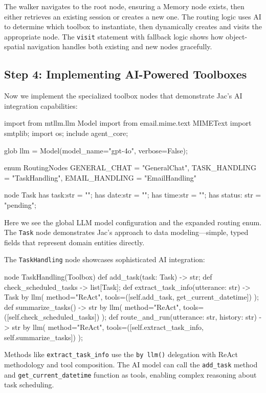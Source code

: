 The walker navigates to the root node, ensuring a Memory node exists, then either retrieves an existing session or creates a new one. The routing logic uses AI to determine which toolbox to instantiate, then dynamically creates and visits the appropriate node. The \texttt{visit} statement with fallback logic shows how object-spatial navigation handles both existing and new nodes gracefully.

\subsection{Step 4: Implementing AI-Powered Toolboxes}

Now we implement the specialized toolbox nodes that demonstrate Jac's AI integration capabilities:

\begin{jacblock}
import from mtllm.llm { Model }
import from email.mime.text { MIMEText }
import smtplib;
import os;
include agent_core;

glob llm = Model(model_name="gpt-4o", verbose=False);

enum RoutingNodes {
    GENERAL_CHAT = "GeneralChat",
    TASK_HANDLING = "TaskHandling",
    EMAIL_HANDLING = "EmailHandling"
}

node Task {
    has task:str = "";
    has date:str = "";
    has time:str = "";
    has status: str = "pending";
}
\end{jacblock}

Here we see the global LLM model configuration and the expanded routing enum. The \texttt{Task} node demonstrates Jac's approach to data modeling—simple, typed fields that represent domain entities directly.

The \texttt{TaskHandling} node showcases sophisticated AI integration:

\begin{jacblock}
node TaskHandling(Toolbox) {
    def add_task(task: Task) -> str;
    def check_scheduled_tasks -> list[Task];
    def extract_task_info(utterance: str) -> Task by llm(
        method="ReAct",
        tools=([self.add_task, get_current_datetime])
    );
    def summarize_tasks() -> str by llm(
        method="ReAct",
        tools=([self.check_scheduled_tasks])
    );
    def route_and_run(utterance: str, history: str) -> str by llm(
        method="ReAct",
        tools=([self.extract_task_info, self.summarize_tasks])
    );
}
\end{jacblock}

Methods like \texttt{extract\_task\_info} use the \texttt{by llm()} delegation with ReAct methodology and tool composition. The AI model can call the \texttt{add\_task} method and \texttt{get\_current\_datetime} function as tools, enabling complex reasoning about task scheduling.

